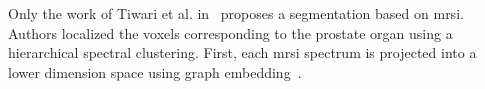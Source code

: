Only the work of Tiwari et al. in~\cite{Tiwari2009} proposes a segmentation based on \ac{mrsi}. Authors localized the voxels corresponding to the prostate organ using a hierarchical spectral clustering. First, each \ac{mrsi} spectrum is projected into a lower dimension space using graph embedding~\cite{Shi2000}.

